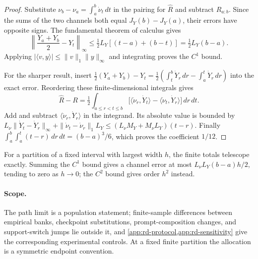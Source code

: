 \begin{proof}
Substitute $\nu_b-\nu_a=\int_a^b\dot\nu_t\,dt$ in the pairing for $\widehat R$ and subtract $R_{a:b}$. Since the sums of the two channels both equal $J_Y(b)-J_Y(a)$, their errors have opposite signs. The fundamental theorem of calculus gives
\[
 \left\|\frac{Y_a+Y_b}{2}-Y_t\right\|_\infty
 \le\tfrac12L_Y[(t-a)+(b-t)]=\tfrac12L_Y(b-a).
\]
Applying $|\langle v,y\rangle|\le\|v\|_1\|y\|_\infty$ and integrating proves the $C^1$ bound.

For the sharper result, insert
$\frac12(Y_a+Y_b)-Y_t=\frac12(\int_t^b\dot Y_r\,dr-\int_a^t\dot Y_r\,dr)$
into the exact error. Reordering these finite-dimensional integrals gives
\[
 \widehat R-R=\tfrac12\int_{a\le r<t\le b}
 \bigl[\langle\dot\nu_r,\dot Y_t\rangle-
       \langle\dot\nu_t,\dot Y_r\rangle\bigr] \,dr\,dt.
\]
Add and subtract $\langle\dot\nu_r,\dot Y_r\rangle$ in the integrand. Its absolute value is bounded by
$L_\nu\|\dot Y_t-\dot Y_r\|_\infty+
 \|\dot\nu_t-\dot\nu_r\|_1L_Y
\le(L_\nu M_Y+M_\nu L_Y)(t-r)$.
Finally $\int_a^b\int_a^t(t-r)\,dr\,dt=(b-a)^3/6$, which proves the coefficient $1/12$.
\end{proof}

For a partition of a fixed interval with largest width $h$, the finite totals telescope exactly. Summing the $C^1$ bound gives a channel error at most $L_\nu L_Y(b-a)h/2$, tending to zero as $h\to0$; the $C^2$ bound gives order $h^2$ instead.

\paragraph{Scope.}
The path limit is a population statement; finite-sample differences between empirical banks, checkpoint substitutions, prompt-composition changes, and support-switch jumps lie outside it, and \cref{app:rd-protocol,app:rd-sensitivity} give the corresponding experimental controls. At a fixed finite partition the allocation is a symmetric endpoint convention.

